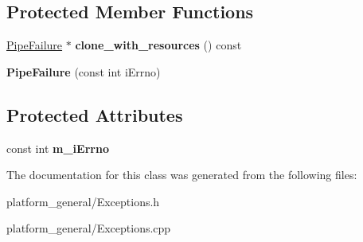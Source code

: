 \subsection*{\-Protected \-Member \-Functions}
\begin{DoxyCompactItemize}
\item 
\hypertarget{classgeneral__server_1_1PipeFailure_aa7c134209fa5aa7c595e982137e6fb2c}{\hyperlink{classgeneral__server_1_1PipeFailure}{\-Pipe\-Failure} $\ast$ {\bfseries clone\-\_\-with\-\_\-resources} () const }\label{classgeneral__server_1_1PipeFailure_aa7c134209fa5aa7c595e982137e6fb2c}

\item 
\hypertarget{classgeneral__server_1_1PipeFailure_a93dd6d15cdfe5d7f733eb7176f6dc9e9}{{\bfseries \-Pipe\-Failure} (const int i\-Errno)}\label{classgeneral__server_1_1PipeFailure_a93dd6d15cdfe5d7f733eb7176f6dc9e9}

\end{DoxyCompactItemize}
\subsection*{\-Protected \-Attributes}
\begin{DoxyCompactItemize}
\item 
\hypertarget{classgeneral__server_1_1PipeFailure_ab6959481be244965fa099b591697d33c}{const int {\bfseries m\-\_\-i\-Errno}}\label{classgeneral__server_1_1PipeFailure_ab6959481be244965fa099b591697d33c}

\end{DoxyCompactItemize}


\-The documentation for this class was generated from the following files\-:\begin{DoxyCompactItemize}
\item 
platform\-\_\-general/\-Exceptions.\-h\item 
platform\-\_\-general/\-Exceptions.\-cpp\end{DoxyCompactItemize}
